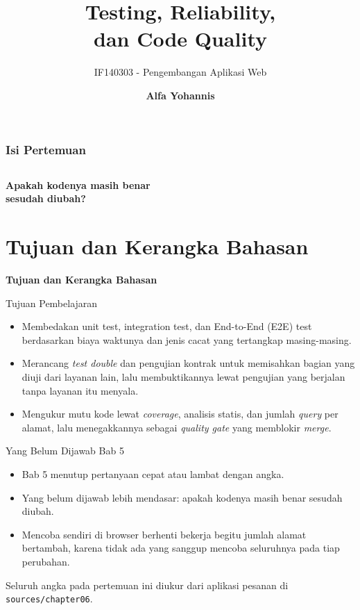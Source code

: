\documentclass[aspectratio=169, table, 12pt]{beamer}
\title{\Huge Testing, Reliability,\\ \vspace{10pt} dan Code Quality}
\subtitle{IF140303 - Pengembangan Aplikasi Web}
\author{\textbf{Alfa Yohannis}}
\begin{document}
\frame{\titlepage}

\begin{frame}[fragile]
  \frametitle{Isi Pertemuan}
  \vspace{14pt}
  \begin{columns}[t]
    {\small\tableofcontents[sections={1-7}]}

    {\small\tableofcontents[sections={8-14}]}
  \end{columns}
\end{frame}

\begin{frame}{\hfill}
  \centering
  \Huge{\textbf{Apakah kodenya masih benar\\sesudah diubah?}}
\end{frame}

\section{Tujuan dan Kerangka Bahasan}

\begin{frame}{\hfill}
  \centering
  \Huge{\textbf{Tujuan dan Kerangka Bahasan}}
\end{frame}

\begin{frame}{{\Large Tujuan Pembelajaran}}
  \vspace{10pt}
  \begin{itemize}
    \item Membedakan unit test, integration test, dan End-to-End (E2E) test
          berdasarkan biaya waktunya dan jenis cacat yang tertangkap
          masing-masing.
    \item Merancang \textit{test double} dan pengujian kontrak untuk
          memisahkan bagian yang diuji dari layanan lain, lalu membuktikannya
          lewat pengujian yang berjalan tanpa layanan itu menyala.
    \item Mengukur mutu kode lewat \textit{coverage}, analisis statis, dan
          jumlah \textit{query} per alamat, lalu menegakkannya sebagai
          \textit{quality gate} yang memblokir \textit{merge}.
  \end{itemize}
\end{frame}

\begin{frame}{{\Large Yang Belum Dijawab Bab 5}}
  \vspace{12pt}
  \begin{itemize}
    \item Bab 5 menutup pertanyaan cepat atau lambat dengan angka.
    \item Yang belum dijawab lebih mendasar: apakah kodenya masih benar
          sesudah diubah.
    \item Mencoba sendiri di browser berhenti bekerja begitu jumlah alamat
          bertambah, karena tidak ada yang sanggup mencoba seluruhnya pada
          tiap perubahan.
  \end{itemize}
  \vspace{8pt}
  {\small Seluruh angka pada pertemuan ini diukur dari aplikasi pesanan di
  \texttt{sources/chapter06}.}
\end{frame}
\end{document}
